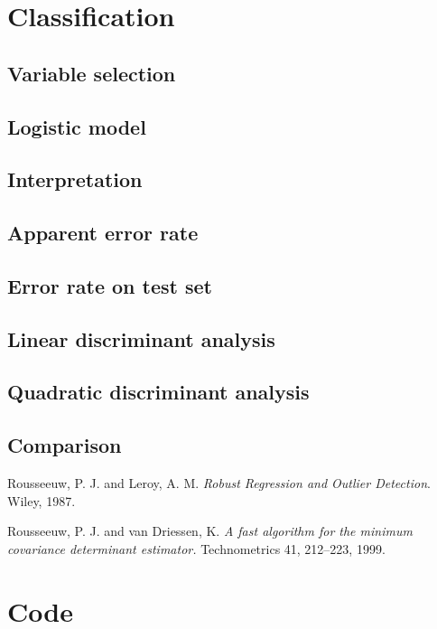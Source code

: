 \documentclass[a4paper, 12pt]{article}
\begin{document}
\section{Classification}
\subsection*{Variable selection}
\subsection*{Logistic model}
\subsection*{Interpretation}
\subsection*{Apparent error rate}
\subsection*{Error rate on test set}
\subsection*{Linear discriminant analysis}
\subsection*{Quadratic discriminant analysis}
\subsection*{Comparison}


\begin{thebibliography}{9}
Rousseeuw, P. J. and Leroy, A. M. 
\textit{Robust Regression and Outlier Detection}. 
Wiley, 1987.

Rousseeuw, P. J. and van Driessen, K.
\textit{A fast algorithm for the minimum covariance determinant estimator.}
Technometrics 41, 212–223, 1999.
\end{thebibliography}


\clearpage
\appendix

\section{Code}
\FloatBarrier
{}








\end{document}
